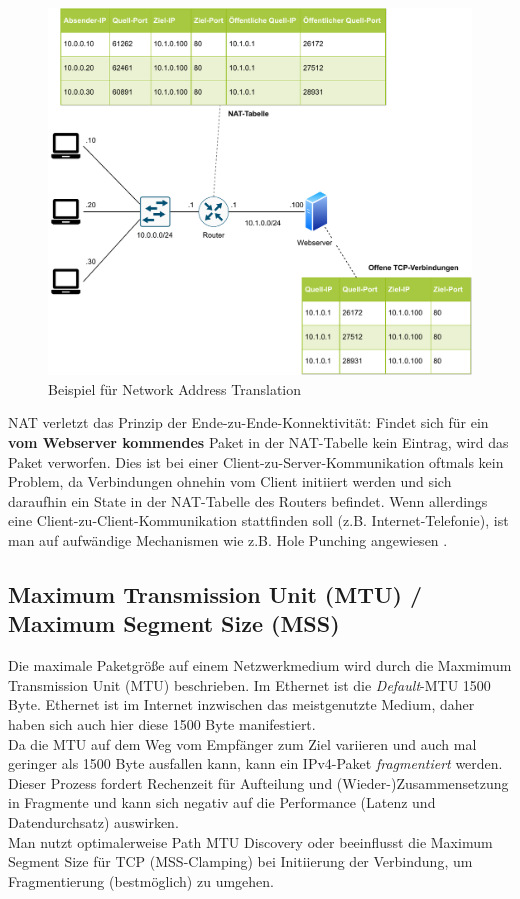 \begin{figure}[h]
  \centering
  \includegraphics[scale=0.90]{Figures/napt.pdf}
  \caption{Beispiel für Network Address Translation}
  \label{grafik: napt}
\end{figure}\FloatBarrier

NAT\label{nat-bad} verletzt das Prinzip der Ende-zu-Ende-Konnektivität: Findet sich für ein \textbf{vom Webserver kommendes} Paket in der \gls{NAT}-Tabelle kein Eintrag, wird das Paket verworfen. Dies ist bei einer \gls{Client}-zu-Server-Kommunikation oftmals kein Problem, da Verbindungen ohnehin vom \gls{Client} initiiert werden und sich daraufhin ein State in der \gls{NAT}-Tabelle des Routers befindet. Wenn allerdings eine \gls{Client}-zu-\gls{Client}-Kommunikation stattfinden soll (z.B. Internet-Telefonie), ist man auf aufwändige Mechanismen wie z.B. Hole Punching angewiesen \cite[S.317]{Fall2011}.\\

\subsection{Maximum Transmission Unit (MTU) / Maximum Segment Size (MSS)}\label{mtumss}
Die maximale Paketgröße auf einem Netzwerkmedium wird durch die Maxmimum Transmission Unit (MTU) beschrieben. Im Ethernet ist die \textit{Default}-\gls{MTU} 1500 Byte.\cite[S.86]{Fall2011} Ethernet ist im Internet inzwischen das meistgenutzte Medium, daher haben sich auch hier diese 1500 Byte manifestiert.\\
Da die \gls{MTU} auf dem Weg vom Empfänger zum Ziel variieren und auch mal geringer als 1500 Byte ausfallen kann, kann ein IPv4-Paket \textit{fragmentiert} werden. Dieser Prozess fordert Rechenzeit für Aufteilung und (Wieder-)Zusammensetzung in Fragmente und kann sich negativ auf die Performance (Latenz und Datendurchsatz) auswirken.\\
Man nutzt optimalerweise Path \gls{MTU} Discovery oder beeinflusst die Maximum Segment Size für \gls{TCP} (\glqq \gls{MSS}-Clamping\grqq{}) bei Initiierung der Verbindung, um Fragmentierung (bestmöglich) zu umgehen.

